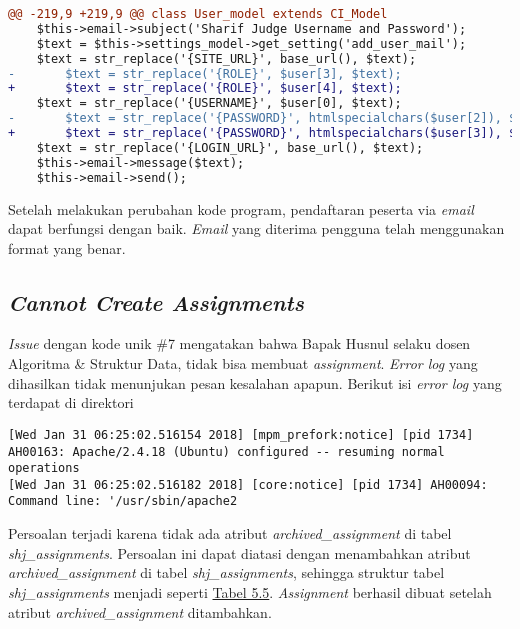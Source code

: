\begin{lstlisting}[language=diff, caption=Perubahan kode program pada \textit{User\_model.php}, label=lstt:2, basicstyle=\ttfamily, frame=single,
columns=fullflexible, keepspaces=true, breaklines=true]
@@ -219,9 +219,9 @@ class User_model extends CI_Model
	$this->email->subject('Sharif Judge Username and Password');
	$text = $this->settings_model->get_setting('add_user_mail');
	$text = str_replace('{SITE_URL}', base_url(), $text);
-   	$text = str_replace('{ROLE}', $user[3], $text);
+   	$text = str_replace('{ROLE}', $user[4], $text);
	$text = str_replace('{USERNAME}', $user[0], $text);
-   	$text = str_replace('{PASSWORD}', htmlspecialchars($user[2]), $text);
+   	$text = str_replace('{PASSWORD}', htmlspecialchars($user[3]), $text);
	$text = str_replace('{LOGIN_URL}', base_url(), $text);
	$this->email->message($text);
	$this->email->send();
\end{lstlisting}
	Setelah melakukan perubahan kode program, pendaftaran peserta via \textit{email} dapat berfungsi dengan baik. \textit{Email} yang diterima pengguna telah menggunakan format yang benar.
	
	\subsection{\textit{Cannot Create Assignments}}
	\textit{Issue} dengan kode unik \#7 mengatakan bahwa Bapak Husnul selaku dosen Algoritma \& Struktur Data, tidak bisa membuat \textit{assignment}.\textit{ Error log} yang dihasilkan tidak menunjukan pesan kesalahan apapun. 
	Berikut isi \textit{error log} yang terdapat di direktori 
\begin{lstlisting}[basicstyle=\ttfamily, frame=single,columns=fullflexible, keepspaces=true, breaklines=true]
[Wed Jan 31 06:25:02.516154 2018] [mpm_prefork:notice] [pid 1734] AH00163: Apache/2.4.18 (Ubuntu) configured -- resuming normal operations
[Wed Jan 31 06:25:02.516182 2018] [core:notice] [pid 1734] AH00094: Command line: '/usr/sbin/apache2
\end{lstlisting}
	
	Persoalan terjadi karena tidak ada atribut \textit{archived\_assignment} di tabel \textit{shj\_assignments}. Persoalan ini dapat diatasi dengan menambahkan atribut \textit{archived\_assignment} di tabel \textit{shj\_assignments}, sehingga struktur tabel \textit{shj\_assignments} menjadi seperti \hyperref[tab:atributtabelassignments]{Tabel 5.5}. \textit{Assignment} berhasil dibuat setelah atribut \textit{archived\_assignment} ditambahkan.
	
